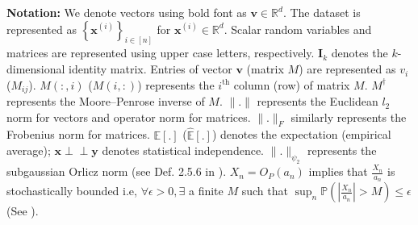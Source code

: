 \documentclass[letterpaper]{article}
\newcommand{\bu}{\pmb{u}}
\newcommand{\bx}{\pmb{x}}
\newcommand{\by}{\pmb{y}}
\newcommand{\bv}{\pmb{v}}
\newcommand{\E}{\mathbb{E}}
\newcommand{\bb}[1]{\left(#1\right)}
\newcommand{\bbb}[1]{\left[#1\right]}
\newcommand{\indep}{\perp \!\!\! \perp}
\begin{document}
 \textbf{Notation:} We denote vectors using bold font as $\bv \in \mathbb{R}^{d}$. The dataset is represented as $\left\{\bx^{\bb{i}}\right\}_{i \in [n]}$ for $\bx^{\bb{i}} \in \mathbb{R}^{d}$. 
Scalar random variables and matrices are represented using upper case letters, respectively. 
 $\bm{I}_k$ denotes the $k$- dimensional identity matrix. Entries of vector $\bv$ (matrix $M$) are represented as $v_{i}$ ($M_{ij}$). $M(:,i)$ ($M(i,:)$) represents the $i^{\text{th}}$ column (row) of matrix $M$. $M^{\dag}$ represents the Moore–Penrose inverse of $M$. $\|.\|$ represents the Euclidean $l_{2}$ norm for vectors and operator norm for matrices. $\|.\|_{F}$ similarly represents the Frobenius norm for matrices. $\E\bbb{.}$ ($\widehat{\E}\bbb{.}$) denotes the expectation (empirical average); $\bx \indep \by$ denotes statistical independence. $\|.\|_{\psi_{2}}$ represents the subgaussian Orlicz norm (see Def. 2.5.6 in \cite{verhsynin-high-dimprob}). $X_{n} = O_{P}\bb{a_n}$ implies that $\frac{X_n}{a_n}$ is stochastically bounded i.e, $\forall \epsilon > 0, \exists $ a finite $M$ such that $\sup_{n}\mathbb{P}(\left|\frac{X_n}{a_n}\right| > M) \leq \epsilon$ (See \cite{van2000asymptotic}).
 
 
\end{document}
